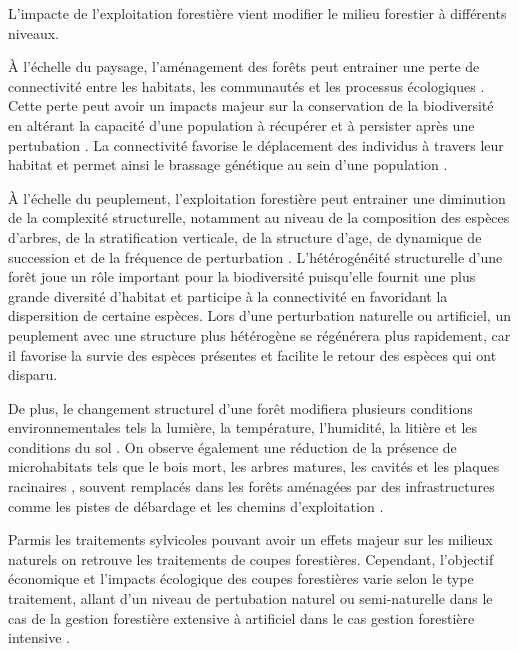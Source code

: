 L'impacte de l'exploitation forestière vient modifier le milieu forestier à différents niveaux.

À l'échelle du paysage, l'aménagement des forêts peut entrainer une perte de connectivité entre les habitats, les communautés et les processus écologiques \citep{Lindenmayer2006Generalmanagement}.
Cette perte peut avoir un impacts majeur sur la conservation de la biodiversité en altérant la capacité d'une population à récupérer et à persister après une pertubation \citep{Lamberson1994ReserveDesign}. 
La connectivité favorise le déplacement des individus à travers leur habitat et permet ainsi le brassage génétique au sein d'une population \citep{Saccheri1998Inbreedingextinction}.

À l'échelle du peuplement, l'exploitation forestière peut entrainer une diminution de la complexité structurelle, notamment au niveau de la composition des espèces d'arbres, de la stratification verticale, de la structure d'age, de dynamique de succession et de la fréquence de perturbation \citep{Commarmot2005Structurevirgin}. 
L'hétérogénéité structurelle d'une forêt joue un rôle important pour la biodiversité puisqu'elle fournit une plus grande diversité d'habitat et participe à la connectivité en favoridant la dispersition de certaine espèces. 
Lors d'une perturbation naturelle ou artificiel, un peuplement avec une structure plus hétérogène se régénérera plus rapidement, car il favorise la survie des espèces présentes et facilite le retour des espèces qui ont disparu. 

De plus, le changement structurel d'une forêt modifiera plusieurs conditions environnementales tels la lumière, la température, l'humidité, la litière et les conditions du sol \citep{Sebastia2005Plantdiversity,Michal2014Responsessmall,James2016effectharvest,Zhang2022Intensiveforest}. 
On observe également une réduction de la présence de microhabitats tels que le bois mort, les arbres matures, les cavités et les plaques racinaires \citep{Berg1994ThreatenedPlant,Spies1999Dynamicforest,Bouget2005Shorttermeffect,Christensen2005Deadwood,Brassard2008EffectsForest}, souvent remplacés dans les forêts aménagées par des infrastructures comme les pistes de débardage et les chemins d'exploitation \citep{Hansen1991ConservingBiodiversity,}. 

Parmis les traitements sylvicoles pouvant avoir un effets majeur sur les milieux naturels on retrouve les traitements de coupes forestières.
Cependant, l'objectif économique et l'impacts écologique des coupes forestières varie selon le type traitement, allant d'un niveau de pertubation naturel ou semi-naturelle dans le cas de la gestion forestière extensive à artificiel dans le cas gestion forestière intensive \citep{Ameray2021Forestcarbon}. 

